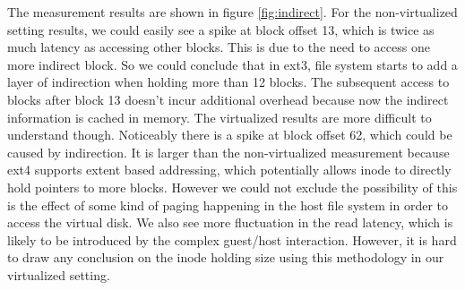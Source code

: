 The measurement results are shown in figure \ref{fig:indirect}. For the non-virtualized setting results, we could easily see a spike at block offset 13, which is twice as much latency as accessing other blocks. This is due to the need to access one more indirect block. So we could conclude that in ext3, file system starts to add a layer of indirection when holding more than 12 blocks. The subsequent access to blocks after block 13 doesn't incur additional overhead because now the indirect information is cached in memory. The virtualized results are more difficult to understand though. Noticeably there is a spike at block offset 62, which could be caused by indirection. It is larger than the non-virtualized measurement because ext4 supports extent based addressing, which potentially allows inode to directly hold pointers to more blocks. However we could not exclude the possibility of this is the effect of some kind of paging happening in the host file system in order to access the virtual disk. We also see more fluctuation in the read latency, which is likely to be introduced by the complex guest/host interaction. However, it is hard to draw any conclusion on the inode holding size using this methodology in our virtualized setting. 
